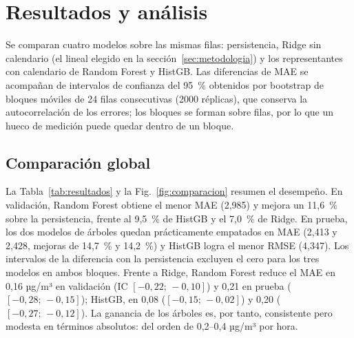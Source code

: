\section{Resultados y análisis}
\label{sec:resultados}
Se comparan cuatro modelos sobre las mismas filas: persistencia, Ridge sin calendario (el lineal elegido en la sección~\ref{sec:metodologia}) y los representantes con calendario de Random Forest y HistGB. Las diferencias de MAE se acompañan de intervalos de confianza del 95~\% obtenidos por bootstrap de bloques móviles de 24 filas consecutivas (2000 réplicas), que conserva la autocorrelación de los errores; los bloques se forman sobre filas, por lo que un hueco de medición puede quedar dentro de un bloque.

\subsection{Comparación global}
\label{sec:comparacion}
La Tabla~\ref{tab:resultados} y la Fig.~\ref{fig:comparacion} resumen el desempeño. En validación, Random Forest obtiene el menor MAE (2,985) y mejora un 11,6~\% sobre la persistencia, frente al 9,5~\% de HistGB y el 7,0~\% de Ridge. En prueba, los dos modelos de árboles quedan prácticamente empatados en MAE (2,413 y 2,428, mejoras de 14,7~\% y 14,2~\%) y HistGB logra el menor RMSE (4,347). Los intervalos de la diferencia con la persistencia excluyen el cero para los tres modelos en ambos bloques. Frente a Ridge, Random Forest reduce el MAE en 0,16 µg/m³ en validación (IC $[-0{,}22;\,-0{,}10]$) y 0,21 en prueba ($[-0{,}28;\,-0{,}15]$); HistGB, en 0,08 ($[-0{,}15;\,-0{,}02]$) y 0,20 ($[-0{,}27;\,-0{,}12]$). La ganancia de los árboles es, por tanto, consistente pero modesta en términos absolutos: del orden de 0,2--0,4 µg/m³ por hora.

